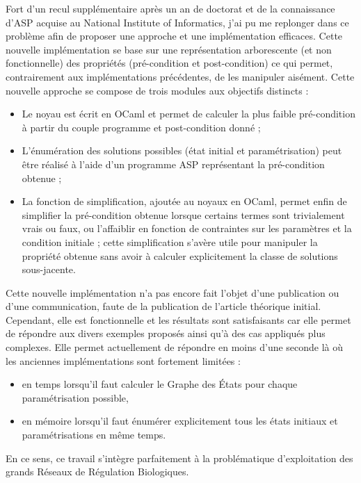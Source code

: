 Fort d'un recul supplémentaire après un an de doctorat et de la connaissance d'ASP acquise au National Institute of Informatics, j'ai pu me replonger dans ce problème afin de proposer une approche et une implémentation efficaces.
Cette nouvelle implémentation se base sur une représentation arborescente (et non fonctionnelle) des propriétés (pré-condition et post-condition) ce qui permet, contrairement aux implémentations précédentes, de les manipuler aisément.
Cette nouvelle approche se compose de trois modules aux objectifs distincts :
\begin{itemize}
  \item Le noyau est écrit en OCaml et permet de calculer la plus faible pré-condition à partir du couple programme et post-condition donné ;
  \item L'énumération des solutions possibles (état initial et paramétrisation) peut être réalisé à l'aide d'un programme ASP représentant la pré-condition obtenue ;
  \item La fonction de simplification, ajoutée au noyaux en OCaml, permet enfin de simplifier la pré-condition obtenue lorsque certains termes sont trivialement vrais ou faux, ou l'affaiblir en fonction de contraintes sur les paramètres et la condition initiale ; cette simplification s'avère utile pour manipuler la propriété obtenue sans avoir à calculer explicitement la classe de solutions sous-jacente.
\end{itemize}

Cette nouvelle implémentation n'a pas encore fait l'objet d'une publication ou d'une communication, faute de la publication de l'article théorique initial.
Cependant, elle est fonctionnelle et les résultats sont satisfaisants car elle permet de répondre aux divers exemples proposés ainsi qu'à des cas appliqués plus complexes.
Elle permet actuellement de répondre en moins d'une seconde  là où les anciennes implémentations sont fortement limitées :
\begin{itemize}
  \item en temps lorsqu'il faut calculer le Graphe des États pour chaque paramétrisation possible,
  \item en mémoire lorsqu'il faut énumérer explicitement tous les états initiaux et paramétrisations en même temps.
\end{itemize}
En ce sens, ce travail s'intègre parfaitement à la problématique d'exploitation des grands Réseaux de Régulation Biologiques.



